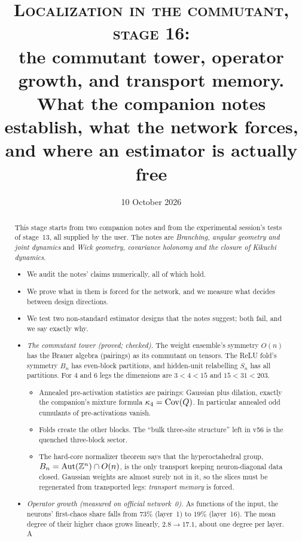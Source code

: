 \documentclass[11pt]{article}
\title{\textsc{Localization in the commutant, stage 16:}\\ \large the commutant tower, operator growth, and transport memory.\\
What the companion notes establish, what the network forces,\\ and where an estimator is actually free}
\author{}
\date{10 October 2026}
\theoremstyle{plain}
\theoremstyle{definition}\newtheorem{definition}[theorem]{Definition}\newtheorem{remark}[theorem]{Remark}
\begin{document}
\maketitle
\begin{abstract}
This stage starts from two companion notes and from the experimental session's tests of stage~13, all supplied by the user. The notes are
\emph{Branching, angular geometry and joint dynamics} and \emph{Wick geometry, covariance holonomy and the closure of Kikuchi dynamics}.
\begin{itemize}[leftmargin=*]
\item We audit the notes' claims numerically, all of which hold.
\item We prove what in them is forced for the network, and we measure what decides between design directions.
\item We test two non-standard estimator designs that the notes suggest; both fail, and we say exactly why.
\end{itemize}
\begin{itemize}[leftmargin=*]
\item \emph{The commutant tower (proved; checked).} The weight ensemble's symmetry $O(n)$ has the Brauer algebra (pairings) as its
commutant on tensors. The ReLU fold's symmetry $B_n$ has even-block partitions, and hidden-unit relabelling $S_n$ has all partitions. For
$4$ and $6$ legs the dimensions are $3<4<15$ and $15<31<203$.
\begin{itemize}
\item Annealed pre-activation statistics are pairings: Gaussian plus dilation, exactly the companion's mixture formula
$\kappa_4=\operatorname{Cov}(Q)$. In particular annealed odd cumulants of pre-activations vanish.
\item Folds create the other blocks. The ``bulk three-site structure'' left in v56 is the quenched three-block sector.
\item The hard-core normalizer theorem says that the hyperoctahedral group, $B_n=\mathrm{Aut}(\mathbb Z^n)\cap O(n)$, is the only
transport keeping neuron-diagonal data closed. Gaussian weights are almost surely not in it, so the slices must be regenerated from transported
legs: \emph{transport memory} is forced.
\end{itemize}
\item \emph{Operator growth (measured on official network~0).} As functions of the input, the neurons' first-chaos share falls from
$73\%$ (layer~1) to $19\%$ (layer~16). The mean degree of their higher chaos grows linearly, $2.8\to17.1$, about one degree per layer. A

\end{itemize}
\end{abstract}
\end{document}
